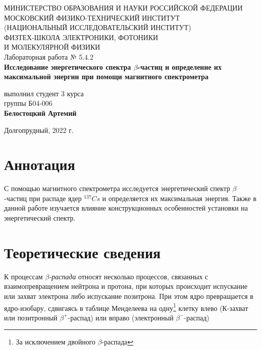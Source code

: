\documentclass[a4paper,12pt]{article}
\begin{document}
 

\begin{titlepage}
	\begin{center}
		\large 	МИНИСТЕРСТВО ОБРАЗОВАНИЯ И НАУКИ РОССИЙСКОЙ ФЕДЕРАЦИИ\\
				МОСКОВСКИЙ ФИЗИКО-ТЕХНИЧЕСКИЙ ИНСТИТУТ \\
				(НАЦИОНАЛЬНЫЙ ИССЛЕДОВАТЕЛЬСКИЙ ИНСТИТУТ)\\ 
				ФИЗТЕХ-ШКОЛА ЭЛЕКТРОНИКИ, ФОТОНИКИ \\
				И МОЛЕКУЛЯРНОЙ ФИЗИКИ \\
		
		
		\vspace{4.0 cm}
		Лабораторная работа № 5.4.2 \\ 
		\LARGE \textbf{Исследование энергетического спектра $\beta$-частиц и определение их максимальной энергии при помощи магнитного спектрометра}
	\end{center}
	\vspace{3 cm} \large
	
	\begin{flushright}
		выполнил студент 3 курса \\
		{группы Б04-006}\\
		\textbf{Белостоцкий Артемий}\\
	\end{flushright}
	
	\vfill

	\begin{center}
	Долгопрудный, 2022 г.
	\end{center}
\end{titlepage}                                                                      

\section*{Аннотация}

С помощью магнитного спектрометра исследуется энергетический спектр $\beta$-частиц при распаде ядер $^{137}Cs$ и определяется их максимальная энергия. Также в данной работе изучается влияние конструкционных особенностей установки на энергетический спектр.

\section*{Теоретические сведения}

К процессам \textit{$\beta$-распада} относят несколько процессов, связанных с взаимопревращением нейтрона и протона, при которых происходит испускание или захват электрона либо испускание позитрона. При этом ядро превращается в ядро-изобару, сдвигаясь в таблице Менделеева на одну\footnote{За исключением двойного $\beta$-распада} клетку влево (К-захват или позитронный $\beta^+$-распад) или вправо (электронный $\beta^-$-распад) %
\end{document}
